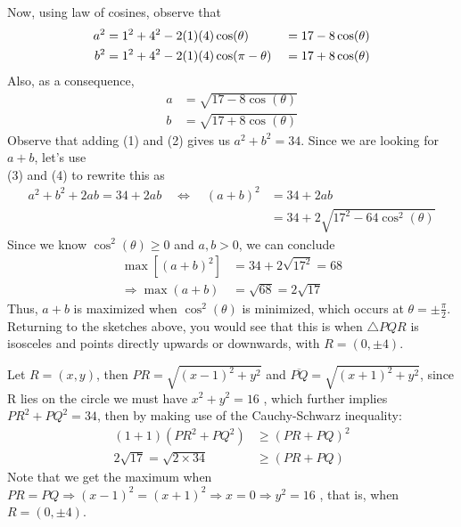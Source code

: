 \documentclass[12pt]{article}
\begin{document}
\begin{solution}[B]
    Now, using law of cosines, observe that
    \begin{alignat}{2} \setcounter{equation}{0}
        a^2 &= 1^2 +4^2 -2(1)(4)\cos(\theta) &= 17 - 8\cos(\theta) \\
        b^2 &= 1^2 +4^2 -2(1)(4)\cos(\pi-\theta) \ &= 17 + 8\cos(\theta)
    \end{alignat}
    Also, as a consequence,%
    \begin{align}
        a &= \sqrt{17 - 8\cos(\theta)}\\
        b &= \sqrt{17 + 8\cos(\theta)}
    \end{align}
    Observe that adding (1) and (2) gives us $a^2+b^2=34$. Since we are looking for $a+b$, let's use \\ (3) and (4) to rewrite this as
    \begin{align*}
        a^2+b^2+2ab=34+2ab \quad \iff \quad (a+b)^2 &= 34+2ab\\
        &=34+2\sqrt{17^2 - 64\cos^2(\theta)}
    \end{align*}
    Since we know $\cos^2(\theta) \geq 0$ and $a,b > 0$, we can conclude
    \begin{align*}
        \max\left[(a+b)^2\right] &= 34+2\sqrt{17^2} = 68 \\
        \Rightarrow \max(a+b) &= \sqrt{68} = \boxed{2\sqrt{17}}
    \end{align*}
    Thus, $a+b$ is maximized when $\cos^2(\theta)$ is minimized, which occurs at $\theta = \pm\frac{\pi}{2}$. Returning to the sketches above, you would see that this is when $\triangle PQR$ is isosceles and points directly upwards or downwards, with $R=(0,\pm4)$.
\end{solution}

\begin{solution}
   Let $R=(x,y)$, then $PR= \sqrt{(x-1)^2+y^2}$ and $\overline{PQ}=\sqrt{(x+1)^2+y^2}$, since R lies on the circle we must have $x^2+y^2=16$ , which further implies $PR^2+PQ^2=34$, then by making use of the Cauchy-Schwarz inequality:
    \begin{align*}
        (1+1)(PR^2 + PQ^2 ) &\geq (PR+PQ)^2 \\
        2\sqrt{17} = \sqrt{2 \times 34} &\geq (PR+PQ) 
    \end{align*}
    Note that we get the maximum when $PR=PQ \Rightarrow (x-1)^2=(x+1)^2 \Rightarrow x=0 \Rightarrow y^2=16$ , that is, when $R=(0,\pm4)$.
    
\end{solution}

\end{document}
